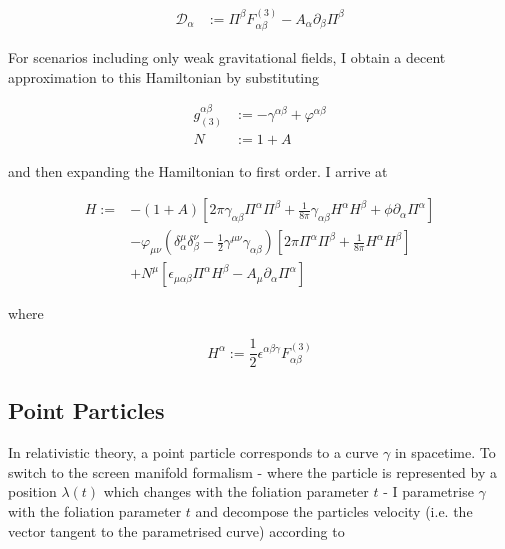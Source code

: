 \documentclass[11pt]{article}
\begin{document}
\begin{align}
	\mathcal{D}_{\alpha} &:= \Pi^{\beta} F^{(3)}_{\alpha \beta} -  A_{\alpha} 
	\partial_{\beta} \Pi^{\beta}
\end{align}


For scenarios including only weak gravitational fields, I obtain a decent approximation to this Hamiltonian by substituting  

\begin{align} 
	g_{(3)}^{\alpha \beta}  
	&:= - \gamma^{\alpha \beta} + \varphi^{\alpha \beta} \label{def_pert_met} \\
	N &:= 1 + A 
\end{align}
	
and then expanding the Hamiltonian to first order. I arrive at

\begin{equation} \label{mel_pert_ham}
\begin{split}
	H :=  
	& - \left( 1 + A \right) 
	\left[
	2 \pi \gamma_{\alpha \beta} \Pi^{\alpha} \Pi^{\beta}
	 + \frac{1}{8 \pi} \gamma_{\alpha \beta} H^{\alpha} H^{\beta}
	 + \phi \partial_{\alpha} \Pi^{\alpha}
	 \right]\\
	 & -  \varphi_{\mu \nu} 
	 \left( \delta_{\alpha}^{\mu}  \delta_{\beta}^{\nu} -  \frac{1}{2} \gamma^{\mu \nu } \gamma_{\alpha \beta} \right)
	 \left[
	 2 \pi  \Pi^{\alpha} \Pi^{\beta}
	 + \frac{1}{8 \pi} H^{\alpha} H^{\beta}
	 \right] \\
	 & + N^{\mu} \left[ 
	 \epsilon_{\mu \alpha \beta} \Pi^{\alpha} H^{\beta} -  A_{\mu} \partial_\alpha \Pi^\alpha
	 \right]
\end{split}
\end{equation}


where 

\begin{equation} \label{def_H_alpha}
	H^\alpha := \frac{1}{2}\epsilon^{\alpha \beta \gamma} F^{(3)}_{\alpha \beta} 
\end{equation}


\subsection{Point Particles} \label{sec_pp_met}

In relativistic theory, a point particle corresponds to a curve $\gamma$ in spacetime. To switch to the screen manifold formalism - where the particle is represented by a position $\lambda (t) $ which changes with the foliation parameter $t$ - I parametrise $\gamma$ with the foliation parameter $t$ and decompose the particles velocity (i.e. the vector tangent to the parametrised curve) according to
\end{document}
